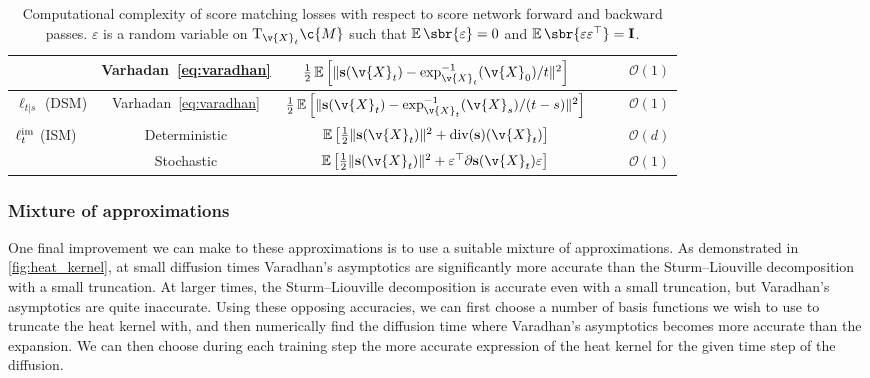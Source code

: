 \begin{table}[t]
\begin{tabular}{lc|c|cc|c}
		                                                  & Varhadan~\eqref{eq:varadhan}            & \(\frac{1}{2} \E \left[ \| \mathbf{s}(\v{X}_t) - \exp_{\v{X}_t}^{-1}(\v{X}_0) / t \|^2 \right]\)                          & \xmark                                             & \cmark                        & \(\mathcal{O}(1)\) \\ \midrule
		\(\ell_{t|s}\) (DSM)                                & Varhadan~\eqref{eq:varadhan}            & \(\frac{1}{2} \E \left[ \| \mathbf{s}(\v{X}_t) - \exp^{-1}_{\v{X}_t}(\v{X}_s) / (t-s) \|^2 \right]\)                      & \xmark                                             & \cmark                        & \(\mathcal{O}(1)\) \\ \midrule
		\multirow{2}{4.5em}{\(\ell^{\textup{im}}_t\) (ISM)} & Deterministic                           & \(\E \left[\frac{1}{2} \| \mathbf{s}(\v{X}_t) \|^2 + \mathrm{div}( \mathbf{s})(\v{X}_t)  \right]\)                        & \xmark                                             & \xmark                        & \(\mathcal{O}(d)\) \\
		                                                  & Stochastic                              & \(\E \left[\frac{1}{2} \| \mathbf{s}(\v{X}_t) \|^2 + \varepsilon^\top \partial \mathbf{s}(\v{X}_t) \varepsilon  \right]\) & \xmark                                             & \xmark                        & \(\mathcal{O}(1)\) \\ \bottomrule
	\end{tabular}
	\caption{\small
	Computational complexity of score matching losses with respect to score network forward and backward passes. \(\varepsilon\) is a random variable on \(\mathrm{T}_{\v{X}_t}\c{M}\) such that \(\E\sbr{\varepsilon}=0\) and \(\E\sbr{\varepsilon\varepsilon^\top}=\m{I}\).}
	\label{tab:sm_losses}
\end{table}

\subsubsection{Mixture of approximations}

One final improvement we can make to these approximations is to use a suitable mixture of approximations.
As demonstrated in \cref{fig:heat_kernel}, at small diffusion times Varadhan's asymptotics are significantly more accurate than the Sturm--Liouville decomposition with a small truncation.
At larger times, the Sturm--Liouville decomposition is accurate even with a small truncation, but Varadhan's asymptotics are quite inaccurate.
Using these opposing accuracies, we can first choose a number of basis functions we wish to use to truncate the heat kernel with, and then numerically find the diffusion time where Varadhan's asymptotics becomes more accurate than the expansion.
We can then choose during each training step the more accurate expression of the heat kernel for the given time step of the diffusion.

